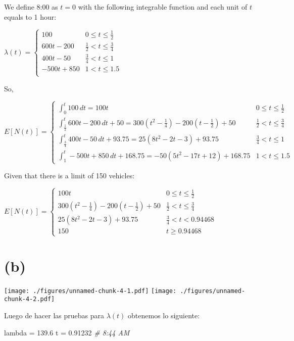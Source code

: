 \documentclass[]{article}
\newenvironment{Shaded}{\begin{snugshade}}{\end{snugshade}}
\newcommand{\CommentTok}[1]{\textcolor[rgb]{0.56,0.35,0.01}{\textit{#1}}}
\newcommand{\FloatTok}[1]{\textcolor[rgb]{0.00,0.00,0.81}{#1}}
\newcommand{\NormalTok}[1]{#1}
\newcommand{\StringTok}[1]{\textcolor[rgb]{0.31,0.60,0.02}{#1}}
\begin{document}
We define 8:00 as \(t=0\) with the following integrable function and
each unit of \(t\) equals to 1 hour:

\(\lambda (t) = \begin{cases} 100 & 0 \leq t \leq \frac{1}{2} \\ 600t - 200 & \frac{1}{2} < t \leq \frac{3}{4} \\ 400t - 50 & \frac{3}{4} < t \leq 1 \\ -500t + 850 & 1 < t \leq 1.5 \\ \end{cases}\)

So,

\(E[N(t)] = \begin{cases} \int_{0}^t 100\,dt = 100t & 0 \leq t \leq \frac{1}{2} \\ \int_{\frac{1}{2}}^t 600t - 200 \,dt + 50 = 300(t^2 - \frac{1}{4}) - 200(t - \frac{1}{2}) + 50 & \frac{1}{2} < t \leq \frac{3}{4} \\ \int_{\frac{3}{4}}^t 400t - 50 \,dt + 93.75 = 25(8t^2 - 2t - 3) + 93.75 & \frac{3}{4} < t \leq 1 \\ \int_{1}^t -500t + 850\,dt + 168.75 = -50(5t^2 - 17t + 12) + 168.75 & 1 < t \leq 1.5 \end{cases}\)

Given that there is a limit of 150 vehicles:

\(E[N(t)] = \begin{cases} 100t & 0 \leq t \leq \frac{1}{2} \\ 300(t^2 - \frac{1}{4}) - 200(t - \frac{1}{2}) + 50 & \frac{1}{2} < t \leq \frac{3}{4} \\ 25(8t^2 - 2t - 3) + 93.75 & \frac{3}{4} < t < 0.94468 \\ 150 & t \geq 0.94468 \end{cases}\)

\hypertarget{b}{%
\section{(b)}\label{b}}

\texttt{[image: ./figures/unnamed-chunk-4-1.pdf]}
\texttt{[image: ./figures/unnamed-chunk-4-2.pdf]}

Luego de hacer las pruebas para \(\lambda (t)\) obtenemos lo siguiente:

\begin{Shaded}
\begin{Highlighting}[]
\NormalTok{lambda =}\StringTok{ }\FloatTok{139.6}
\NormalTok{t =}\StringTok{ }\FloatTok{0.91232}
\CommentTok{# 8:44 AM}
\end{Highlighting}
\end{Shaded}
\end{document}
